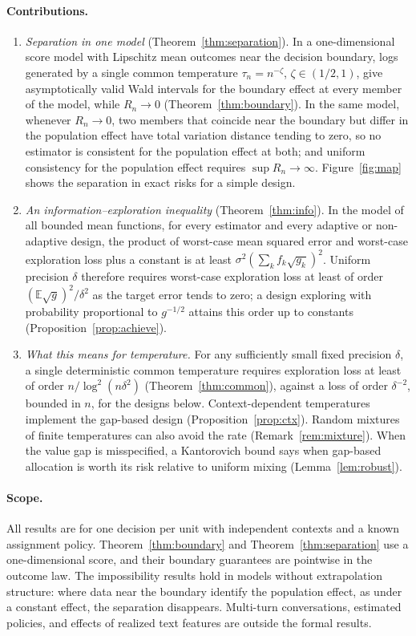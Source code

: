 \documentclass[12pt]{article}
\theoremstyle{definition}
\theoremstyle{remark}
\newcommand{\E}{\mathbb{E}}
\begin{document}
\paragraph{Contributions.}
\begin{enumerate}[leftmargin=1.5em,itemsep=3pt]
\item \emph{Separation in one model} (Theorem~\ref{thm:separation}). In a
one-dimensional score model with Lipschitz mean outcomes near the decision
boundary, logs generated by a single common temperature
$\tau_n = n^{-\zeta}$, $\zeta\in(1/2,1)$, give asymptotically valid Wald
intervals for the boundary effect at every member of the model, while
$R_n\to0$ (Theorem~\ref{thm:boundary}). In the same model, whenever $R_n\to0$,
two members that coincide near the boundary but differ in the population
effect have total variation distance tending to zero, so no estimator is
consistent for the population effect at both; and uniform consistency for the
population effect requires $\sup R_n\to\infty$. Figure~\ref{fig:map} shows the
separation in exact risks for a simple design.
\item \emph{An information--exploration inequality}
(Theorem~\ref{thm:info}). In the model of all bounded mean functions, for
every estimator and every adaptive or non-adaptive design, the product of
worst-case mean squared error and worst-case exploration loss plus a constant
is at least $\sigma^2(\sum_k f_k\sqrt{g_k})^{2}$. Uniform precision $\delta$
therefore requires worst-case exploration loss at least of order
$(\E\sqrt g)^2/\delta^2$ as the target error tends to zero; a design exploring with
probability proportional to $g^{-1/2}$ attains this order up to constants
(Proposition~\ref{prop:achieve}).
\item \emph{What this means for temperature.} For any sufficiently small fixed
precision $\delta$, a single deterministic common temperature requires
exploration loss at least of order $n/\log^2(n\delta^2)$
(Theorem~\ref{thm:common}), against a loss of order $\delta^{-2}$, bounded in
$n$, for the designs below. Context-dependent temperatures implement the
gap-based design (Proposition~\ref{prop:ctx}). Random mixtures of finite temperatures can also
avoid the rate (Remark~\ref{rem:mixture}). When the value gap is misspecified,
a Kantorovich bound says when gap-based allocation is worth its risk relative
to uniform mixing (Lemma~\ref{lem:robust}).
\end{enumerate}

\paragraph{Scope.} All results are for one decision per unit with independent
contexts and a known assignment policy. Theorem~\ref{thm:boundary} and
Theorem~\ref{thm:separation} use a one-dimensional score, and their boundary
guarantees are pointwise in the outcome law. The impossibility results hold
in models without extrapolation structure: where data near the boundary
identify the population effect, as under a constant effect, the separation
disappears. Multi-turn conversations, estimated policies, and effects of
realized text features are outside the formal results.
\end{document}
